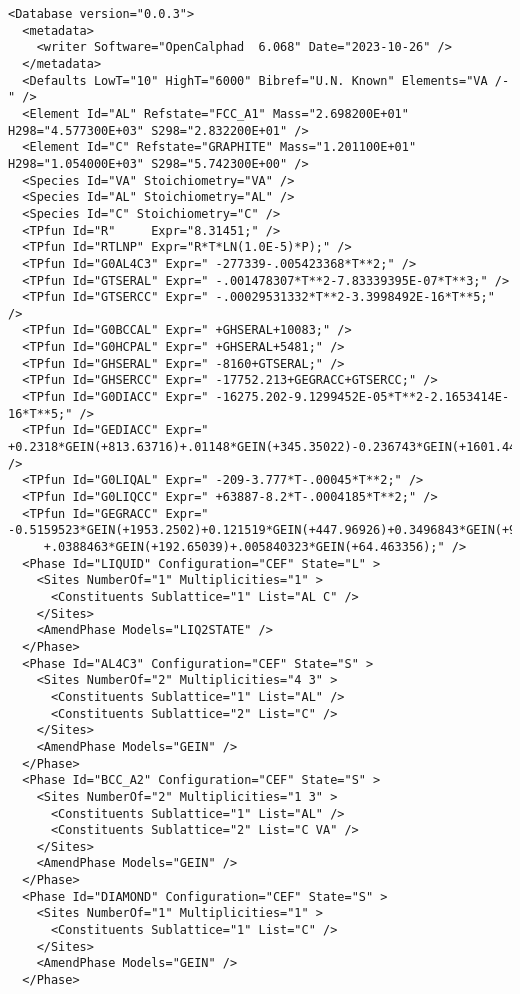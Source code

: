 \documentclass{article}
\begin{document}
\begin{appendices}
{\small
\begin{verbatim}
<Database version="0.0.3">
  <metadata>
    <writer Software="OpenCalphad  6.068" Date="2023-10-26" />
  </metadata>
  <Defaults LowT="10" HighT="6000" Bibref="U.N. Known" Elements="VA /-" />
  <Element Id="AL" Refstate="FCC_A1" Mass="2.698200E+01" H298="4.577300E+03" S298="2.832200E+01" />
  <Element Id="C" Refstate="GRAPHITE" Mass="1.201100E+01" H298="1.054000E+03" S298="5.742300E+00" />
  <Species Id="VA" Stoichiometry="VA" />
  <Species Id="AL" Stoichiometry="AL" />
  <Species Id="C" Stoichiometry="C" />
  <TPfun Id="R"     Expr="8.31451;" />
  <TPfun Id="RTLNP" Expr="R*T*LN(1.0E-5)*P);" />
  <TPfun Id="G0AL4C3" Expr=" -277339-.005423368*T**2;" /> 
  <TPfun Id="GTSERAL" Expr=" -.001478307*T**2-7.83339395E-07*T**3;" /> 
  <TPfun Id="GTSERCC" Expr=" -.00029531332*T**2-3.3998492E-16*T**5;" /> 
  <TPfun Id="G0BCCAL" Expr=" +GHSERAL+10083;" /> 
  <TPfun Id="G0HCPAL" Expr=" +GHSERAL+5481;" /> 
  <TPfun Id="GHSERAL" Expr=" -8160+GTSERAL;" /> 
  <TPfun Id="GHSERCC" Expr=" -17752.213+GEGRACC+GTSERCC;" /> 
  <TPfun Id="G0DIACC" Expr=" -16275.202-9.1299452E-05*T**2-2.1653414E-16*T**5;" /> 
  <TPfun Id="GEDIACC" Expr=" +0.2318*GEIN(+813.63716)+.01148*GEIN(+345.35022)-0.236743*GEIN(+1601.4467);" /> 
  <TPfun Id="G0LIQAL" Expr=" -209-3.777*T-.00045*T**2;" /> 
  <TPfun Id="G0LIQCC" Expr=" +63887-8.2*T-.0004185*T**2;" /> 
  <TPfun Id="GEGRACC" Expr=" -0.5159523*GEIN(+1953.2502)+0.121519*GEIN(+447.96926)+0.3496843*GEIN(+947.01605)
     +.0388463*GEIN(+192.65039)+.005840323*GEIN(+64.463356);" /> 
  <Phase Id="LIQUID" Configuration="CEF" State="L" >
    <Sites NumberOf="1" Multiplicities="1" >
      <Constituents Sublattice="1" List="AL C" />
    </Sites>
    <AmendPhase Models="LIQ2STATE" />
  </Phase>
  <Phase Id="AL4C3" Configuration="CEF" State="S" >
    <Sites NumberOf="2" Multiplicities="4 3" >
      <Constituents Sublattice="1" List="AL" />
      <Constituents Sublattice="2" List="C" />
    </Sites>
    <AmendPhase Models="GEIN" />
  </Phase>
  <Phase Id="BCC_A2" Configuration="CEF" State="S" >
    <Sites NumberOf="2" Multiplicities="1 3" >
      <Constituents Sublattice="1" List="AL" />
      <Constituents Sublattice="2" List="C VA" />
    </Sites>
    <AmendPhase Models="GEIN" />
  </Phase>
  <Phase Id="DIAMOND" Configuration="CEF" State="S" >
    <Sites NumberOf="1" Multiplicities="1" >
      <Constituents Sublattice="1" List="C" />
    </Sites>
    <AmendPhase Models="GEIN" />
  </Phase>



\end{verbatim}}
\end{appendices}
\end{document}
